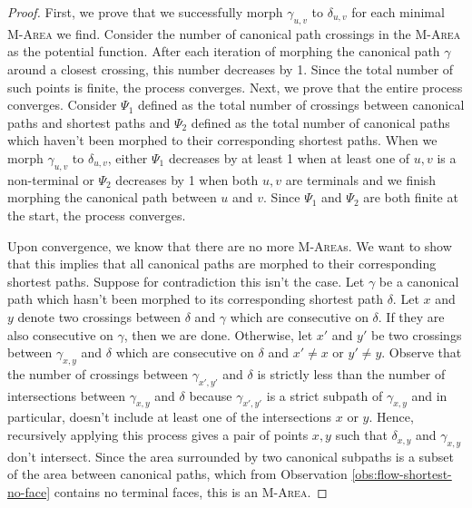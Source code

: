 \documentclass[11pt]{article}
\begin{document}
\begin{proof}
    First, we prove that we successfully morph $\gamma_{u,v}$ to $\delta_{u,v}$ for each minimal \textsc{M-Area} we find. Consider the number of canonical path crossings in the \textsc{M-Area} as the potential function. After each iteration of morphing the canonical path $\gamma$ around a closest crossing, this number decreases by 1. Since the total number of such points is finite, the process converges. Next, we prove that the entire process converges. Consider $\Psi_1$ defined as the total number of crossings between canonical paths and shortest paths and $\Psi_2$ defined as the total number of canonical paths which haven't been morphed to their corresponding shortest paths. When we morph $\gamma_{u,v}$ to $\delta_{u,v}$, either $\Psi_1$ decreases by at least 1 when at least one of $u,v$ is a non-terminal or $\Psi_2$ decreases by 1 when both $u,v$ are terminals and we finish morphing the canonical path between $u$ and $v$. Since $\Psi_1$ and $\Psi_2$ are both finite at the start, the process converges.


    Upon convergence, we know that there are no more \textsc{M-Area}s. We want to show that this implies that all canonical paths are morphed to their corresponding shortest paths. Suppose for contradiction this isn't the case. Let $\gamma$ be a canonical path which hasn't been morphed to its corresponding shortest path $\delta$. Let $x$ and $y$ denote two crossings between $\delta$ and $\gamma$ which are consecutive on $\delta$. If they are also consecutive on $\gamma$, then we are done. Otherwise, let $x'$ and $y'$ be two crossings between $\gamma_{x,y}$ and $\delta$ which are consecutive on $\delta$ and $x'\neq x$ or $y'\neq y$. Observe that the number of crossings between $\gamma_{x',y'}$ and $\delta$ is strictly less than the number of intersections between $\gamma_{x,y}$ and $\delta$ because $\gamma_{x',y'}$ is a strict subpath of $\gamma_{x,y}$ and in particular, doesn't include at least one of the intersections $x$ or $y$. Hence, recursively applying this process gives a pair of points $x,y$ such that $\delta_{x,y}$ and $\gamma_{x,y}$ don't intersect. Since the area surrounded by two canonical subpaths is a subset of the area between canonical paths, which from Observation \ref{obs:flow-shortest-no-face} contains no terminal faces, this is an \textsc{M-Area}. 
\end{proof}

\end{document}

